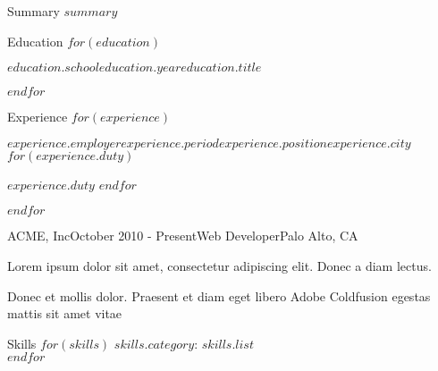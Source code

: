 \documentclass[$page$, 11pt]{resume}
\begin{document}
  \begin{rSection}{Summary}
  $summary$ 
  \end{rSection}

  \begin{rSection}{Education}
    $for(education)$
    \begin{eSubsection}{$education.school$}{$education.year$}{$education.title$}{}
     \end{eSubsection}
    $endfor$
  \end{rSection}
  
  
  \begin{rSection}{Experience}
    $for(experience)$
    \begin{rSubsection}{$experience.employer$}{$experience.period$}{$experience.position$}{$experience.city$}
    $for(experience.duty)$
    \item $experience.duty$
    $endfor$
    \end{rSubsection}
    $endfor$
    
    \begin{rSubsection}{ACME, Inc}{October 2010 - Present}{Web Developer}{Palo Alto, CA}
    \item Lorem ipsum dolor sit amet, consectetur adipiscing elit. Donec a diam lectus.
    \item Donec et mollis dolor. Praesent et diam eget libero Adobe Coldfusion egestas mattis sit amet vitae 
    \end{rSubsection}
  \end{rSection}
  
  
  \begin{rSection}{Skills}
  $for(skills)$
    \textbf{$skills.category$}: $skills.list$ \\
  $endfor$
  \end{rSection}
\end{document}
